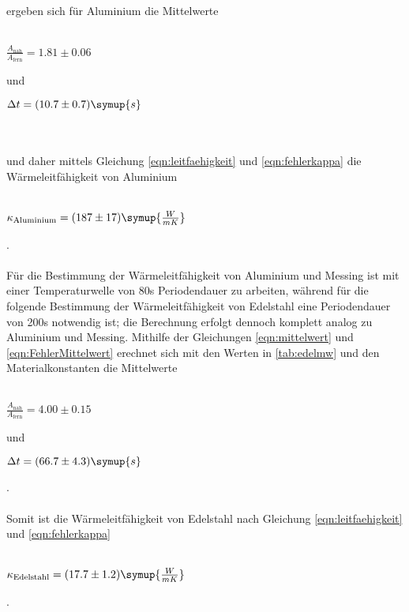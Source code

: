 ergeben sich für Aluminium die Mittelwerte
\\ \\
\centerline{$\frac{A_\text{nah}}{A_\text{fern}} = 1.81 \pm 0.06$}
und
\centerline{$\Delta t = (10.7 \pm 0.7) \symup{s}$}
\\ \\
und daher mittels Gleichung \eqref{eqn:leitfaehigkeit} und \eqref{eqn:fehlerkappa} die Wärmeleitfähigkeit von Aluminium
\\ \\ 
\centerline{$\kappa_\text{Aluminium} = (187 \pm 17) \symup{\frac{W}{mK}}$}.
\\ \\
Für die Bestimmung der Wärmeleitfähigkeit von Aluminium und Messing ist mit einer Temperaturwelle von 80s Periodendauer zu arbeiten,
während für die folgende Bestimmung der Wärmeleitfähigkeit von Edelstahl eine Periodendauer von 200s notwendig ist; die Berechnung erfolgt
dennoch komplett analog zu Aluminium und Messing.
Mithilfe der Gleichungen \eqref{eqn:mittelwert} und \eqref{eqn:FehlerMittelwert} erechnet sich mit den Werten in \autoref{tab:edelmw} und den Materialkonstanten die Mittelwerte
\\ \\
\centerline{$\frac{A_\text{nah}}{A_\text{fern}} = 4.00 \pm 0.15$}
und
\centerline{$\Delta t = (66.7 \pm 4.3) \symup{s}$}.
\\ \\
Somit ist die Wärmeleitfähigkeit von Edelstahl nach Gleichung \eqref{eqn:leitfaehigkeit} und \eqref{eqn:fehlerkappa}
\\ \\ 
\centerline{$\kappa_\text{Edelstahl} = (17.7 \pm 1.2) \symup{\frac{W}{mK}}$}.
\\ \\






